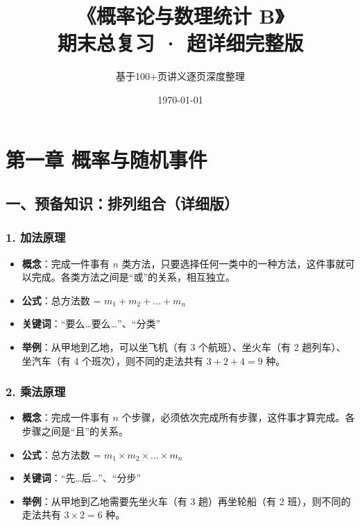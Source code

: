 \documentclass[12pt,a4paper]{ctexart}
\title{\Huge \textbf{《概率论与数理统计 B》} \\ \Large 期末总复习 · 超详细完整版}
\author{基于100+页讲义逐页深度整理}
\date{\today}
\begin{document}
\newpage

\maketitle
\tableofcontents
\newpage

\section{第一章 概率与随机事件}

\subsection{一、预备知识：排列组合（详细版）}

\subsubsection{1. 加法原理}
\begin{itemize}[noitemsep]
    \item \textbf{概念}：完成一件事有 $n$ 类方法，只要选择任何一类中的一种方法，这件事就可以完成。各类方法之间是“或”的关系，相互独立。
    \item \textbf{公式}：总方法数 = $m_1 + m_2 + \dots + m_n$
    \item \textbf{关键词}：“要么…要么…”、“分类”
    \item \textbf{举例}：从甲地到乙地，可以坐飞机（有 3 个航班）、坐火车（有 2 趟列车）、坐汽车（有 4 个班次），则不同的走法共有 $3+2+4=9$ 种。
\end{itemize}

\subsubsection{2. 乘法原理}
\begin{itemize}[noitemsep]
    \item \textbf{概念}：完成一件事有 $n$ 个步骤，必须依次完成所有步骤，这件事才算完成。各步骤之间是“且”的关系。
    \item \textbf{公式}：总方法数 = $m_1 \times m_2 \times \dots \times m_n$
    \item \textbf{关键词}：“先…后…”、“分步”
    \item \textbf{举例}：从甲地到乙地需要先坐火车（有 3 趟）再坐轮船（有 2 班），则不同的走法共有 $3 \times 2 = 6$ 种。
\end{itemize}
\end{document}
